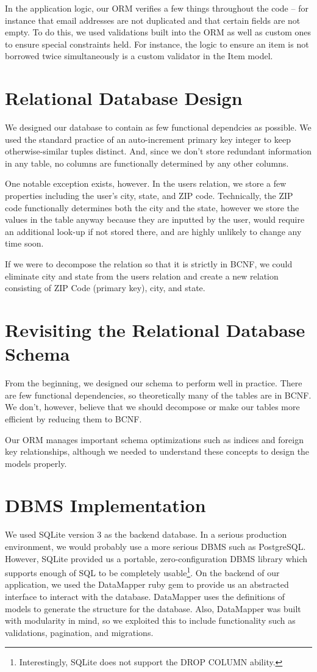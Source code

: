 \documentclass{acm_proc_article-sp}
\begin{document}
In the application logic, our ORM verifies a few things throughout the code -- for instance that email addresses 
are not duplicated and that certain fields are not empty. To do this, we used validations built into the ORM as
well as custom ones to ensure special constraints held. For instance, the logic to ensure an item is not borrowed
twice simultaneously is a custom validator in the Item model.
\section{Relational Database Design}
We designed our database to contain as few functional dependcies as possible. We used the standard practice of an
auto-increment primary key integer to keep otherwise-similar tuples distinct. And, since we don't store redundant information
in any table, no columns are functionally determined by any other columns.

One notable exception exists, however. In the users relation, we store a few properties including the user's city, state, and ZIP code. 
Technically, the ZIP code functionally determines both the city and the state, however we store the values in the table
anyway because they are inputted by the user, would require an additional look-up if not stored there, and are highly unlikely
to change any time soon. 

If we were to decompose the relation so that it is strictly in BCNF, we could eliminate city and state from the users
relation and create a new relation consisting of ZIP Code (primary key), city, and state.
\section{Revisiting the Relational Database Schema}
From the beginning, we designed our schema to perform well in practice. There are few functional dependencies, so
theoretically many of the tables are in BCNF. We don't, however, believe that we should decompose or make our tables
more efficient by reducing them to BCNF.

Our ORM manages important schema optimizations such as indices and foreign key relationships, although we needed to
understand these concepts to design the models properly.
\section{DBMS Implementation}
We used SQLite version 3 as the backend database. In a serious production environment, we would probably use
a more serious DBMS such as PostgreSQL. However, SQLite provided us a portable, zero-configuration DBMS library
which supports enough of SQL to be completely usable\footnote{Interestingly, SQLite does not support the DROP COLUMN ability.}.
On the backend of our application, we used the DataMapper ruby gem to provide us an abstracted interface to
interact with the database. DataMapper uses the definitions of models to generate the structure for the database.
Also, DataMapper was built with modularity in mind, so we exploited this to include functionality such as validations,
pagination, and migrations.
\end{document}
